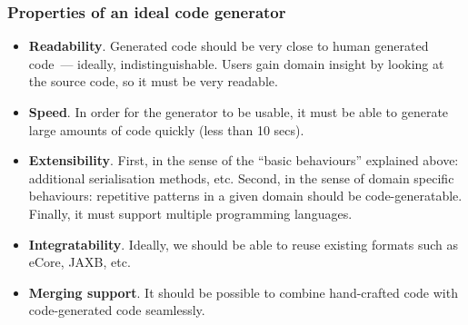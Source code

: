 \documentclass{beamer}
\begin{document}
\begin{frame}
\frametitle{Properties of an ideal code generator}

\begin{itemize}

\item \textbf{Readability}. Generated code should be very close to
  human generated code~--- ideally, indistinguishable. Users gain
  domain insight by looking at the source code, so it must be very
  readable.

\pause

\item \textbf{Speed}. In order for the generator to be usable, it must
  be able to generate large amounts of code quickly (less than 10
  secs).

\pause

\item \textbf{Extensibility}. First, in the sense of the ``basic
  behaviours'' explained above: additional serialisation methods,
  etc. Second, in the sense of domain specific behaviours: repetitive
  patterns in a given domain should be code-generatable. Finally, it
  must support multiple programming languages.

\pause

\item \textbf{Integratability}. Ideally, we should be able to reuse
  existing formats such as eCore, JAXB, etc.

\pause

\item \textbf{Merging support}. It should be possible to combine
  hand-crafted code with code-generated code seamlessly.

\end{itemize}

\end{frame}
\end{document}
